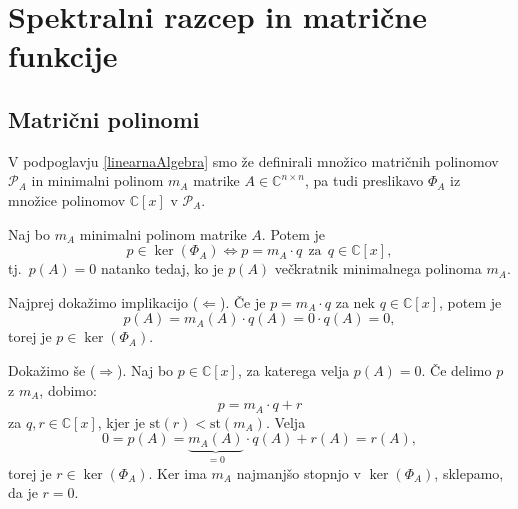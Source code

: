 \documentclass[mat1]{fmfdelo}
\newcommand{\C}{\mathbb C}
\begin{document}
\section{Spektralni razcep in matrične funkcije}
\subsection{Matrični polinomi}
V podpoglavju \ref{linearnaAlgebra} smo že definirali množico matričnih polinomov $\mathcal{P}_A$ in minimalni polinom $m_A$ matrike $A \in \C^{n \times n}$, pa tudi preslikavo $\Phi_A$ iz množice polinomov $\C [x]$ v $\mathcal{P}_A$.
\begin{trditev}\label{trditevMinimalniPolinom}
    Naj bo $m_A$ minimalni polinom matrike $A$. Potem je
    \begin{equation*}
        p \in \ker \left(\Phi_A\right) \Leftrightarrow p = m_A \cdot q\ \  \text{za}\ \ q \in \C [x],
    \end{equation*}
    tj.\ $p(A) = 0$ natanko tedaj, ko je $p(A)$ večkratnik minimalnega polinoma $m_A$.
\end{trditev}
\begin{dokaz}
    Najprej dokažimo implikacijo ($\Leftarrow$). Če je $p = m_A\cdot q$ za nek $q \in \C [x]$, potem je
    \begin{equation*}
        p(A) = m_A(A) \cdot q(A) = 0 \cdot q(A) = 0,
    \end{equation*}
    torej je $p \in \ker\left(\Phi_A\right)$.
    
    Dokažimo še ($\Rightarrow$). Naj bo $p \in \C [x]$, za katerega velja $p(A) = 0$. Če delimo $p$ z $m_A$, dobimo:
    \begin{equation*}
        p = m_A \cdot q + r
    \end{equation*}
    za $q, r \in \C [x]$, kjer je $\text{st}(r) < \text{st}\left(m_A\right)$. Velja
    \begin{equation*}
        0 = p(A) = \underbrace{m_A(A)}_{=0} \cdot q(A) + r(A) = r(A),
    \end{equation*}
    torej je $r \in \ker\left(\Phi_A\right)$. Ker ima $m_A$ najmanjšo stopnjo v $\ker\left(\Phi_A\right)$, sklepamo, da je $r = 0$.
\end{dokaz}
\end{document}
